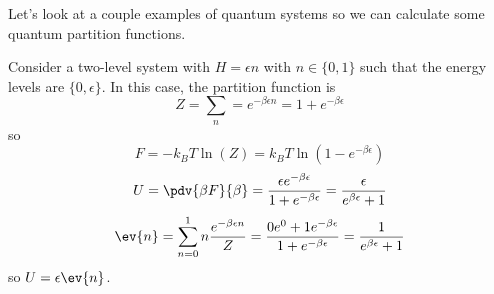 \documentclass[a4paper,twoside,master.tex]{subfiles}
\begin{document}


Let's look at a couple examples of quantum systems so we can calculate some quantum partition functions.

\begin{ex}
    Consider a two-level system with $ H = \epsilon n $ with $ n \in \{0,1\} $ such that the energy levels are $ \{0, \epsilon\} $. In this case, the partition function is
    \begin{equation}
        Z = \sum_n = e^{- \beta \epsilon n} = 1 + e^{- \beta \epsilon}
    \end{equation}
    so
    \begin{equation}
        F = - k_B T \ln(Z) = k_B T \ln(1 - e^{- \beta \epsilon}) 
    \end{equation}
    \begin{equation}
        U = \pdv{\beta F}{\beta} = \frac{\epsilon e^{- \beta \epsilon}}{1 + e^{- \beta \epsilon}} = \frac{\epsilon}{e^{\beta \epsilon} + 1}
    \end{equation}
    \begin{equation}
        \ev{n} = \sum_{n=0}^{1} n \frac{e^{- \beta \epsilon n}}{Z} = \frac{0 e^{0} + 1 e^{- \beta \epsilon}}{1 + e^{- \beta \epsilon}} = \frac{1}{e^{\beta \epsilon} + 1}
    \end{equation}
    so $ U = \epsilon \ev{n} $.
\end{ex}
\end{document}
